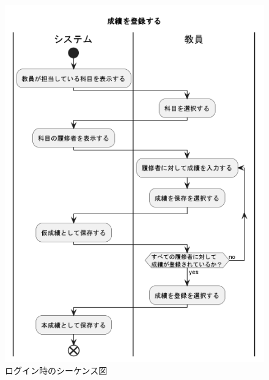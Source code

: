 \documentclass[documentclass]{jsarticle}
\begin{document}
\begin{figure}[H]
  \centering
  \begin{minipage}[b]{0.49\columnwidth}
      \centering
      \includegraphics[width=1.0\columnwidth]{figure/7-5.png}
      \caption{ログイン時のシーケンス図}
      \label{fig:7-5}
  \end{minipage}
  \begin{minipage}[b]{0.49\columnwidth}
      \centering

\end{minipage}
\end{figure}
\end{document}

